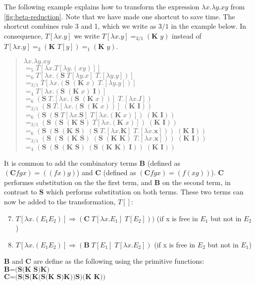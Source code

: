 \para
The following example explains how to transform the expression $\lambda x.\lambda y.xy$ from \autoref{fig:beta-reduction}. Note that we have made one shortcut to save time. The shortcut combines rule 3 and 1, which we write as $3/1$ in the example below.
In consequence, $T[\lambda x.y]$ we write $T[\lambda x.y] =_{3/1} (\textbf{K } y)$ instead of $T[\lambda x.y] =_{3} (\textbf{K } T[y]) =_{1} (\textbf{K } y)$.
\begin{quote}
    $\lambda x.\lambda y.xy$ \\
    $=_5 T[\lambda x.T[\lambda y.(xy)]]$ \\
    $=_6 T[\lambda x. (\textbf{S}\; T[\lambda y.x]\; T.[\lambda y.y])]$ \\
    $=_{3/1} T[\lambda x. (\textbf{S}\;(\textbf{K}\; x) \; T.[\lambda y.y])]$ \\  
    $=_4 T[\lambda x. (\textbf{S}\;(\textbf{K}\; x) \; \textbf{I})]$ \\
    $=_6 (\textbf{S} \; T.[\lambda x.(\textbf{S}\;(\textbf{K}\; x))] \; T.[\lambda x.I])$ \\
    $=_{3/1} (\textbf{S} \; T.[\lambda x.(\textbf{S}\;(\textbf{K}\; x))] \; (\textbf{K I}))$ \\
    $=_{6} (\textbf{S} \; (\textbf{S} \; T[\lambda x.\textbf{S}] \; T[\lambda x.(\textbf{K} \; x)]) \; (\textbf{K I}))$ \\
    $=_{3/1} (\textbf{S} \; (\textbf{S} \; (\textbf{K S}) \; T[\lambda x.(\textbf{K} \; x)]) \; (\textbf{K I}))$ \\
    $=_{6} (\textbf{S} \; (\textbf{S} \; (\textbf{K S}) \; (\textbf{S} \; T.[\lambda x.\textbf{K}] \; T.[\lambda x.\textbf{x}]) ) \; (\textbf{K I}))$ \\
    $=_{3/1} (\textbf{S} \; (\textbf{S} \; (\textbf{K S}) \; (\textbf{S} \; (\textbf{K K}) \; T.[\lambda x.\textbf{x}]) ) \; (\textbf{K I}))$ \\
    $=_4 (\textbf{S} \; (\textbf{S} \; (\textbf{K S}) \; (\textbf{S} \; (\textbf{K K}) \; \textbf{I}) ) \; (\textbf{K I}))$ \\      
\end{quote}
It is common to add the combinatory terms \textbf{B} (defined as $(\textbf{C} f g x) = ((f x )g)$) 
and \textbf{C} (defined as $(\textbf{C} f g x) = (f (x g))$). \textbf{C} performes substitution on the the first term, and \textbf{B} on the second term, in contrast to \textbf{S} which performs substitution on both terms. These two terms can now be added to the transformation, $T[]$:
\begin{enumerate}
    \setcounter{enumi}{6}
    \item $T[\lambda x.(E_1 E_2)] \Rightarrow (\textbf{C} \; T[\lambda x.E_1] \; T[E_2]))$ (if x is free in $E_1$ but not in $E_2$)
    \item $T[\lambda x.(E_1 E_2)] \Rightarrow (\textbf{B} \; T[E_1] \; T[\lambda x.E_2])$ (if x is free in $E_2$ but not in $E_1$)
\end{enumerate}
\textbf{B} and \textbf{C} are define as the following using the primitive functions:\\
$\textbf{B=(S(K S)K)}$\\
$\textbf{C=(S(S(K(S(K S)K))S)(K K))}$\\

